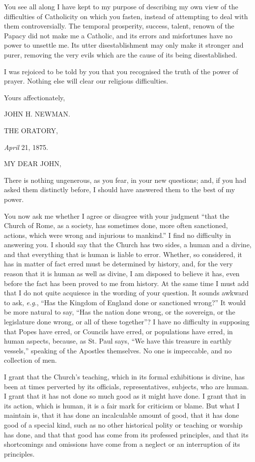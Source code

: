 You see all along I have kept to my purpose of
describing my own view of the difficulties of Catholicity on which you
fasten, instead of attempting to deal with them controversially. The
temporal prosperity, success, talent, renown of the Papacy did not
make me a Catholic, and its errors and misfortunes have no power to
unsettle me. Its utter disestablishment may only make it stronger and
purer, removing the very evils which are the cause of its being
disestablished.

I was rejoiced to be told by you that you
recognised the truth of the power of prayer. Nothing else will clear
our religious difficulties.

Yours affectionately,

JOHN H. NEWMAN.

THE ORATORY,

\emph{April} 21, 1875.

MY DEAR
JOHN,

There is nothing ungenerous, as you fear, in your new questions; and,
if you had asked them distinctly before, I should have answered them
to the best of my power.

You now ask me whether I agree or disagree with
your judgment ``that the Church of Rome, as a society, has sometimes
done, more often sanctioned, actions, which were wrong and injurious
to mankind.'' I find no difficulty in answering you. I should say that
the Church has two sides, a human and a divine, and that everything
that is human is liable to error. Whether, so considered, it has in
matter of fact erred must be determined by history, and, for the very
reason that it is human as well as divine, I am disposed to believe it
has, even before the fact has been proved to me from history. At the
same time I must add that I do not quite acquiesce in the wording of
your question. It sounds awkward to ask, \emph{e.g}., ``Has the Kingdom
of England done or sanctioned wrong?'' It would be more natural to say,
``Has the nation done wrong, or the sovereign, or the legislature done
wrong, or all of these together''? I have no difficulty in supposing
that Popes have erred, or Councils have erred, or populations have
erred, in human aspects, because, as St. Paul says, ``We have this
treasure in earthly vessels,'' speaking of the Apostles themselves. No
one is impeccable, and no collection of men.

I grant that the Church's teaching, which in its
formal exhibitions is divine, has been at times perverted by its
officials, representatives, subjects, who are human. I grant that it
has not done so much good as it might have done. I grant that in its
action, which is human, it is a fair mark for criticism or blame. But
what I maintain is, that it has done an incalculable amount of good,
that it has done good of a special kind, such as no other historical
polity or teaching or worship has done, and that that good has come
from its professed principles, and that its shortcomings and omissions
have come from a neglect or an interruption of its principles.

